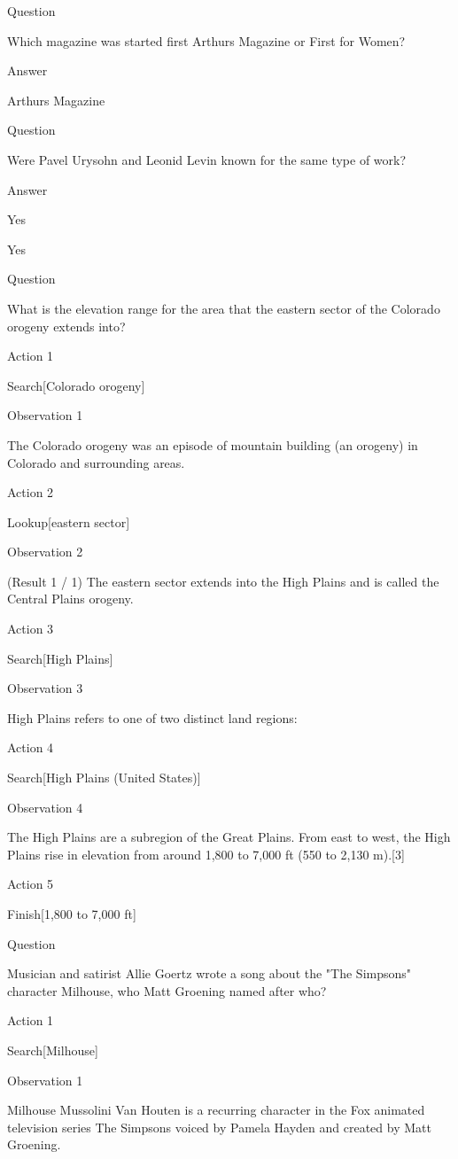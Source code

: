\documentclass[
]{article}
\begin{document}
Question

Which magazine was started first Arthur\textquotesingle s Magazine or
First for Women?

Answer

Arthur\textquotesingle s Magazine

Question

Were Pavel Urysohn and Leonid Levin known for the same type of work?

Answer

Yes

Yes

Question

What is the elevation range for the area that the eastern sector of the
Colorado orogeny extends into?

Action 1

Search{[}Colorado orogeny{]}

Observation 1

The Colorado orogeny was an episode of mountain building (an orogeny) in
Colorado and surrounding areas.

Action 2

Lookup{[}eastern sector{]}

Observation 2

(Result 1 / 1) The eastern sector extends into the High Plains and is
called the Central Plains orogeny.

Action 3

Search{[}High Plains{]}

Observation 3

High Plains refers to one of two distinct land regions:

Action 4

Search{[}High Plains (United States){]}

Observation 4

The High Plains are a subregion of the Great Plains. From east to west,
the High Plains rise in elevation from around 1,800 to 7,000 ft (550 to
2,130 m).{[}3{]}

Action 5

Finish{[}1,800 to 7,000 ft{]}

Question

Musician and satirist Allie Goertz wrote a song about the "The Simpsons"
character Milhouse, who Matt Groening named after who?

Action 1

Search{[}Milhouse{]}

Observation 1

Milhouse Mussolini Van Houten is a recurring character in the Fox
animated television series The Simpsons voiced by Pamela Hayden and
created by Matt Groening.
\end{document}
